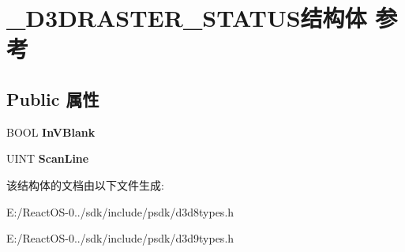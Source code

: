 \hypertarget{struct___d3_d_r_a_s_t_e_r___s_t_a_t_u_s}{}\section{\+\_\+\+D3\+D\+R\+A\+S\+T\+E\+R\+\_\+\+S\+T\+A\+T\+U\+S结构体 参考}
\label{struct___d3_d_r_a_s_t_e_r___s_t_a_t_u_s}
\subsection*{Public 属性}
\begin{DoxyCompactItemize}
\item 
\mbox{\label{struct___d3_d_r_a_s_t_e_r___s_t_a_t_u_s_a599625d12bc8ae4856bab6113f37ba29}} 
B\+O\+OL {\bfseries In\+V\+Blank}
\item 
\mbox{\label{struct___d3_d_r_a_s_t_e_r___s_t_a_t_u_s_add9fa35132679ce2d7a127b8b327ce11}} 
U\+I\+NT {\bfseries Scan\+Line}
\end{DoxyCompactItemize}


该结构体的文档由以下文件生成\+:\begin{DoxyCompactItemize}
\item 
E\+:/\+React\+O\+S-\/0../sdk/include/psdk/d3d8types.\+h\item 
E\+:/\+React\+O\+S-\/0../sdk/include/psdk/d3d9types.\+h\end{DoxyCompactItemize}
